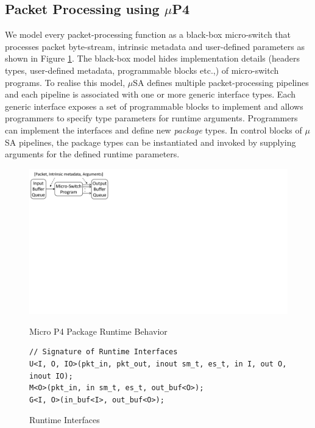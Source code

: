 \subsection{Packet Processing using $\mu$P4}
\label{subsection:packet-processing-using-mp4}
We model every packet-processing function as a black-box micro-switch that processes packet byte-stream, intrinsic metadata and user-defined parameters as shown in Figure \ref{fig:package-runtime-behavior}.
The black-box model hides implementation details (headers types, user-defined metadata, programmable blocks etc.,) of micro-switch programs.
To realise this model, $\mu$SA defines multiple packet-processing pipelines and each pipeline is associated with one or more generic interface types.
Each generic interface exposes a set of programmable blocks to implement and allows programmers to specify type parameters for runtime arguments.
Programmers can implement the interfaces and define new \emph{package} types.
In control blocks of $\mu$SA pipelines, the package types can be instantiated and invoked by supplying arguments for the defined runtime parameters. 
\begin{figure}[!h]
    \centering
    \includegraphics[trim=0 420 667 0, clip, scale=0.5]{microp4-program-model}
    \label{fig:package-runtime-behavior}
    \caption{Micro P4 Package Runtime Behavior}
\end{figure}

\begin{figure}[!h]
\begin{lstlisting}[frame=none]
// Signature of Runtime Interfaces
U<I, O, IO>(pkt_in, pkt_out, inout sm_t, es_t, in I, out O, inout IO); 
M<O>(pkt_in, in sm_t, es_t, out_buf<O>); 
G<I, O>(in_buf<I>, out_buf<O>); 
\end{lstlisting}
\caption{Runtime Interfaces}
\label{fig:interfaces}
\end{figure}

